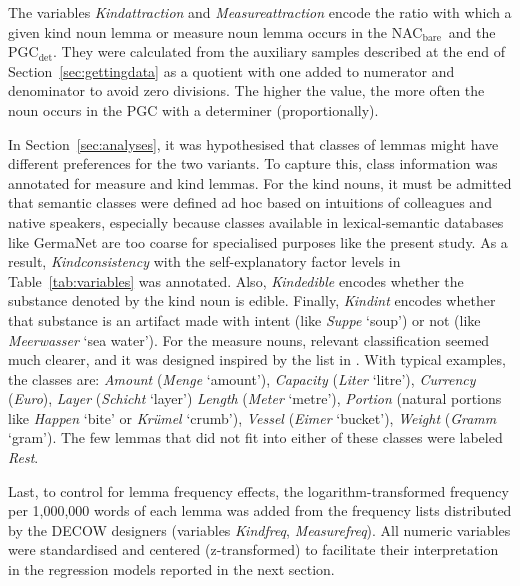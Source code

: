 \documentclass[USenglish]{article}
\newcommand{\Sub}[1]{\ensuremath{\mathrm{_{#1}}}}
\newcommand{\NACb}{NAC\Sub{bare}}
\newcommand{\PGCd}{PGC\Sub{det}}
\begin{document}
The variables \textit{Kindattraction} and \textit{Measureattraction} encode the ratio with which a given kind noun lemma or measure noun lemma occurs in the \NACb\ and the \PGCd.
They were calculated from the auxiliary samples described at the end of Section~\ref{sec:gettingdata} as a quotient with one added to numerator and denominator to avoid zero divisions.
The higher the value, the more often the noun occurs in the PGC with a determiner (proportionally).

In Section~\ref{sec:analyses}, it was hypothesised that classes of lemmas might have different preferences for the two variants.
To capture this, class information was annotated for measure and kind lemmas.
For the kind nouns, it must be admitted that semantic classes were defined ad hoc based on intuitions of colleagues and native speakers, especially because classes available in lexical-semantic databases like GermaNet \citep{HampFeldweg1997} are too coarse for specialised purposes like the present study.
As a result, \textit{Kindconsistency} with the self-explanatory factor levels in Table~\ref{tab:variables} was annotated.
Also, \textit{Kindedible} encodes whether the substance denoted by the kind noun is edible.
Finally, \textit{Kindint} encodes whether that substance is an artifact made with intent (like \textit{Suppe} `soup') or not (like \textit{Meerwasser} `sea water').
For the measure nouns, relevant classification seemed much clearer, and it was designed inspired by the list in \cite[530]{Koptjevskaja2001}.
With typical examples, the classes are:
\textit{Amount} (\textit{Menge} `amount'), 
\textit{Capacity} (\textit{Liter} `litre'), 
\textit{Currency} (\textit{Euro}), 
\textit{Layer} (\textit{Schicht} `layer')
\textit{Length} (\textit{Meter} `metre'), 
\textit{Portion} (natural portions like \textit{Happen} `bite' or \textit{Krümel} `crumb'), 
\textit{Vessel} (\textit{Eimer} `bucket'), 
\textit{Weight} (\textit{Gramm} `gram').
The few lemmas that did not fit into either of these classes were labeled \textit{Rest}.

Last, to control for lemma frequency effects, the logarithm-transformed frequency per 1,000,000 words of each lemma was added from the frequency lists distributed by the DECOW designers (variables \textit{Kindfreq}, \textit{Measurefreq}).
All numeric variables were standardised and centered (z-transformed) to facilitate their interpretation in the regression models reported 
in the next section.

\end{document}
